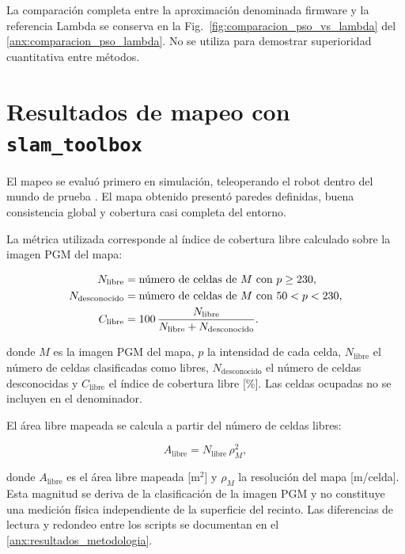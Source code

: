 La comparación completa entre la aproximación denominada
firmware y la referencia Lambda se conserva en la
Fig.~\ref{fig:comparacion_pso_vs_lambda} del \ref{anx:comparacion_pso_lambda}.
No se utiliza para demostrar superioridad cuantitativa entre métodos.

\section{Resultados de mapeo con \texttt{slam\_toolbox}}
\label{sec:resultados_slam}

El mapeo se evaluó primero en simulación, teleoperando el robot dentro del mundo de prueba . El mapa obtenido presentó paredes definidas, buena consistencia global y cobertura casi completa del entorno.

La métrica utilizada corresponde al índice de cobertura libre calculado sobre
la imagen PGM del mapa:

\begin{align}
N_{\mathrm{libre}}
&=
\text{número de celdas de } M \text{ con } p\geq230,
\notag\\
N_{\mathrm{desconocido}}
&=
\text{número de celdas de } M \text{ con } 50<p<230,
\notag\\
C_{\mathrm{libre}}
&=
100\,
\frac{N_{\mathrm{libre}}}
{N_{\mathrm{libre}}+N_{\mathrm{desconocido}}}.
\label{eq:cobertura_libre}
\end{align}

\noindent donde $M$ es la imagen PGM del mapa, $p$ la intensidad de cada
celda, $N_{\mathrm{libre}}$ el número de celdas clasificadas como libres,
$N_{\mathrm{desconocido}}$ el número de celdas desconocidas y
$C_{\mathrm{libre}}$ el índice de cobertura libre [\%]. Las celdas ocupadas
no se incluyen en el denominador.

El área libre mapeada se calcula a partir del número de celdas libres:

\begin{equation}
A_{\mathrm{libre}}
=
N_{\mathrm{libre}}\,\rho_M^2,
\label{eq:area_libre_mapeada}
\end{equation}

\noindent donde $A_{\mathrm{libre}}$ es el área libre mapeada [m$^2$] y $\rho_M$ la resolución del mapa [m/celda]. Esta magnitud se deriva de la clasificación de la imagen PGM y no constituye una
medición física independiente de la superficie del recinto. Las diferencias
de lectura y redondeo entre los scripts se documentan en el
\ref{anx:resultados_metodologia}.

